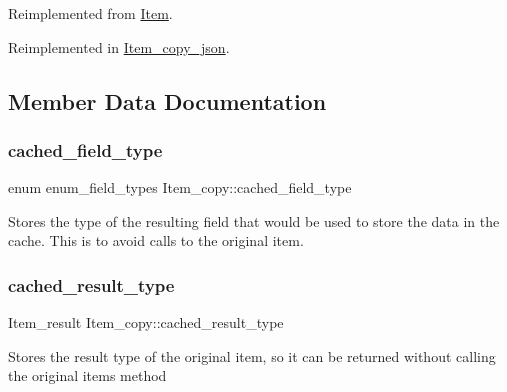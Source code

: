 Reimplemented from \mbox{\hyperlink{classItem_a57e763fcde2d0a819d21e31c59611290}{Item}}.



Reimplemented in \mbox{\hyperlink{classItem__copy__json_aead579100651419c06fe93f2e53bb396}{Item\+\_\+copy\+\_\+json}}.



\subsection{Member Data Documentation}
\mbox{\label{classItem__copy_a2b2bd611a7e3e0336047fd591e59e740}} 
\subsubsection{\texorpdfstring{cached\+\_\+field\+\_\+type}{cached\_field\_type}}
{\footnotesize\ttfamily enum enum\+\_\+field\+\_\+types Item\+\_\+copy\+::cached\+\_\+field\+\_\+type\hspace{0.3cm}{\ttfamily [protected]}}

Stores the type of the resulting field that would be used to store the data in the cache. This is to avoid calls to the original item. \mbox{\label{classItem__copy_a4d6be8ad88366f64c79477f0f145b72d}} 
\subsubsection{\texorpdfstring{cached\+\_\+result\+\_\+type}{cached\_result\_type}}
{\footnotesize\ttfamily Item\+\_\+result Item\+\_\+copy\+::cached\+\_\+result\+\_\+type\hspace{0.3cm}{\ttfamily [protected]}}

Stores the result type of the original item, so it can be returned without calling the original item\textquotesingle{}s method \mbox{\label{classItem__copy_a9ef1b9fd547a3b940e89e9837083c87f}} 
